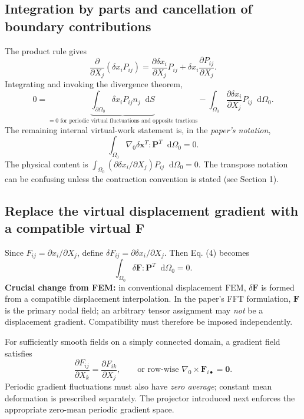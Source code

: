\documentclass[11pt,a4paper]{article}
\numberwithin{equation}{section}
\newcommand{\F}{\mathbf F}
\newcommand{\Pstress}{\mathbf P}
\newcommand{\xvec}{\mathbf x}
\newcommand{\zero}{\mathbf0}
\newcommand{\diff}{\mathop{}\!\mathrm d}
\newcommand{\paper}[1]{\tag{#1}}
\begin{document}
\subsection{Integration by parts and cancellation of boundary contributions}
The product rule gives
\[
\frac{\partial}{\partial X_j}(\delta x_i P_{ij})
=\frac{\partial\delta x_i}{\partial X_j}P_{ij}
+\delta x_i\frac{\partial P_{ij}}{\partial X_j}.
\]
Integrating and invoking the divergence theorem,
\[
0=\underbrace{\int_{\partial\Omega_0}\delta x_i P_{ij}n_j\diff S}_{=0\text{ for periodic virtual fluctuations and opposite tractions}}
-\int_{\Omega_0}\frac{\partial\delta x_i}{\partial X_j}P_{ij}\diff\Omega_0.
\]
The remaining internal virtual-work statement is, in the \emph{paper's notation},
\begin{equation}
\int_{\Omega_0}\nabla_0\delta\xvec^T:\Pstress^T\diff\Omega_0=0.
\paper{4}\label{p4}\end{equation}
The physical content is $\int_{\Omega_0}(\partial\delta x_i/\partial X_j)P_{ij}\diff\Omega_0=0$. The transpose notation can be confusing unless the contraction convention is stated (see Section 1).

\subsection{Replace the virtual displacement gradient with a compatible virtual \texorpdfstring{$\F$}{F}}
Since $F_{ij}=\partial x_i/\partial X_j$, define $\delta F_{ij}=\partial\delta x_i/\partial X_j$. Then Eq. (4) becomes
\begin{equation}
\int_{\Omega_0}\delta\F:\Pstress^T\diff\Omega_0=0.
\paper{5}\label{p5}\end{equation}
\textbf{Crucial change from FEM:} in conventional displacement FEM, $\delta\F$ is formed from a compatible displacement interpolation. In the paper's FFT formulation, $\F$ is the primary nodal field; an arbitrary tensor assignment may \emph{not} be a displacement gradient. Compatibility must therefore be imposed independently.

For sufficiently smooth fields on a simply connected domain, a gradient field satisfies
\[
\frac{\partial F_{ij}}{\partial X_k}=\frac{\partial F_{ik}}{\partial X_j},\qquad\text{or row-wise }\nabla_0\times\F_{i\bullet}=\zero.
\]
Periodic gradient fluctuations must also have \emph{zero average}; constant mean deformation is prescribed separately. The projector introduced next enforces the appropriate zero-mean periodic gradient space.
\end{document}
